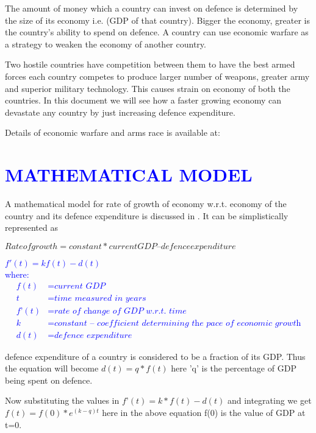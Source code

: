 \documentclass[12pt]{article}
\begin{document}
The amount of money which a country can invest on defence is determined by the size of its economy
i.e. (GDP of that country). Bigger the economy, greater is the country’s ability to spend on defence.
A country can use economic warfare as a strategy to weaken the economy of another country.

Two hostile countries have competition between them to have the best armed forces each country
competes to produce larger number of weapons, greater army and superior military technology.
This causes strain on economy of both the countries. In this document we will see how a faster growing 
economy can devastate any country by just increasing defence expenditure.

Details of economic warfare and arms race is available at: \cite{1} \cite{2}

\section{\textcolor{blue}{ MATHEMATICAL MODEL }}
A mathematical model for rate of growth of economy w.r.t. economy of the country and its defence 
expenditure is discussed in \cite{3}. It can be simplistically represented as 

$Rate of growth = constant*current GDP – defence expenditure$
\vspace{.5 cm}

\textcolor{blue}
{
$f'(t) = k f(t) - d(t)$ \\
where: 
\begin{align*}
f(t) &= \textit{current GDP} \\
t &= \textit{time measured in years} \\
f’(t) &= \textit{rate of change of GDP w.r.t. time} \\
k &= \textit{constant – coefficient determining the pace of economic growth} \\
d(t) &= \textit{defence expenditure} 
\end{align*}
}

defence expenditure of a country is considered to be a fraction of its GDP. Thus the equation will become 
$d(t) = q* f(t)$ here 'q' is the percentage of GDP being spent on defence. 

Now substituting the values in $f’(t) = k*f(t) - d(t)$ and integrating we get
$f(t) = f(0)*e^{(k-q)t}$ here in the above equation f(0) is the value of GDP at t=0.

\newpage
\end{document}
